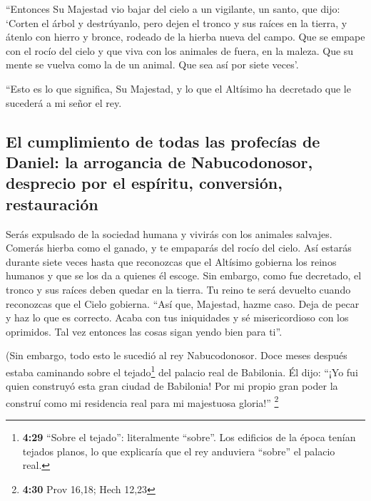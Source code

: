  ``Entonces Su Majestad vio bajar del cielo a un
vigilante, un santo, que dijo: `Corten el árbol y destrúyanlo, pero
dejen el tronco y sus raíces en la tierra, y átenlo con hierro y bronce,
rodeado de la hierba nueva del campo. Que se empape con el rocío del
cielo y que viva con los animales de fuera, en la maleza. Que su mente
se vuelva como la de un animal. Que sea así por siete veces'.

 ``Esto es lo que significa, Su Majestad, y lo que el
Altísimo ha decretado que le sucederá a mi señor el rey.

\hypertarget{el-cumplimiento-de-todas-las-profecuxedas-de-daniel-la-arrogancia-de-nabucodonosor-desprecio-por-el-espuxedritu-conversiuxf3n-restauraciuxf3n}{%
\subsection{El cumplimiento de todas las profecías de Daniel: la
arrogancia de Nabucodonosor, desprecio por el espíritu, conversión,
restauración}\label{el-cumplimiento-de-todas-las-profecuxedas-de-daniel-la-arrogancia-de-nabucodonosor-desprecio-por-el-espuxedritu-conversiuxf3n-restauraciuxf3n}}

 Serás expulsado de la sociedad humana y vivirás con los
animales salvajes. Comerás hierba como el ganado, y te empaparás del
rocío del cielo. Así estarás durante siete veces hasta que reconozcas
que el Altísimo gobierna los reinos humanos y que se los da a quienes él
escoge.  Sin embargo, como fue decretado, el tronco y sus
raíces deben quedar en la tierra. Tu reino te será devuelto cuando
reconozcas que el Cielo gobierna.  ``Así que, Majestad,
hazme caso. Deja de pecar y haz lo que es correcto. Acaba con tus
iniquidades y sé misericordioso con los oprimidos. Tal vez entonces las
cosas sigan yendo bien para ti''.

 (Sin embargo, todo esto le sucedió al rey Nabucodonosor.
 Doce meses después estaba caminando sobre el
tejado\footnote{\textbf{4:29} ``Sobre el tejado'': literalmente
  ``sobre''. Los edificios de la época tenían tejados planos, lo que
  explicaría que el rey anduviera ``sobre'' el palacio real.} del
palacio real de Babilonia.  Él dijo: ``¡Yo fui quien
construyó esta gran ciudad de Babilonia! Por mi propio gran poder la
construí como mi residencia real para mi majestuosa gloria!''
\footnote{\textbf{4:30} Prov 16,18; Hech 12,23}

